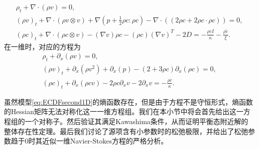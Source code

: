 % 
\begin{subequations} \label{eq:ECDFsecondisothermal}
		\begin{align}
			\rho_t + \nabla \cdot (\rho v) = 0 ,\\
			(\rho v)_t + \nabla \cdot (\rho v \otimes v) + \nabla (p + \frac{1}{2} \rho c: \rho c)  - \nabla \cdot ( (2 \rho c + 2 \rho c \cdot \rho c)) =0 ,\\
			(\rho c)_t +  \nabla \cdot (\rho c \otimes v) - (\nabla v) \rho c - (\rho c) (\nabla v)^T - 2 D = - \frac{\rho \dot{c}I}{\kappa} -  \frac{\rho \mathring{c}}{\xi}  .
		\end{align}
\end{subequations}
在一维时，对应的方程为
\begin{subequations} \label{eq:ECDFsecond1D}
		\begin{align}
			\rho_t + \partial_x (\rho v) = 0 ,\\
			(\rho v)_t + \partial_x (\rho v^2) + \partial_x (p)   -  (2+ 3 \rho c) \partial_x (  \rho c) =0 ,\\
			(\rho c)_t +  \partial_x (\rho c  v) - 2 \rho c \partial_x  v  - 2 \partial_x v = - \frac{\rho \dot{c}}{\kappa}  .
		\end{align}
\end{subequations}

虽然模型\eqref{eq:ECDFsecond1D}的熵函数存在，但是由于方程不是守恒形式，熵函数的Hessian矩阵无法对称化这一一维方程组。我们在本小节中将会首先给出这一方程组的一个对称子。然后验证其满足Kawashima条件，从而证明平衡态附近解的整体存在性定理。最后我们讨论了源项含有小参数时的松弛极限，并给出了松弛参数趋于0时其近似一维Navier-Stokes方程的严格分析。

